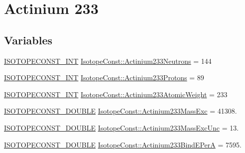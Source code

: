 \hypertarget{group___isotope_const-_actinium-_ac233}{}\section{Actinium 233}
\label{group___isotope_const-_actinium-_ac233}
\subsection*{Variables}
\begin{DoxyCompactItemize}
\item 
\mbox{\hyperlink{group___isotope_const-_macros_ga5f18360b3e99483a35c32d789e62621c}{I\+S\+O\+T\+O\+P\+E\+C\+O\+N\+S\+T\+\_\+\+I\+NT}} \mbox{\hyperlink{group___isotope_const-_actinium-_ac233_gaf223236e8ed52b39bbc070f0c2dd67b1}{Isotope\+Const\+::\+Actinium233\+Neutrons}} = 144
\item 
\mbox{\hyperlink{group___isotope_const-_macros_ga5f18360b3e99483a35c32d789e62621c}{I\+S\+O\+T\+O\+P\+E\+C\+O\+N\+S\+T\+\_\+\+I\+NT}} \mbox{\hyperlink{group___isotope_const-_actinium-_ac233_ga89c2ad6441d70babb87d3ab9555541d2}{Isotope\+Const\+::\+Actinium233\+Protons}} = 89
\item 
\mbox{\hyperlink{group___isotope_const-_macros_ga5f18360b3e99483a35c32d789e62621c}{I\+S\+O\+T\+O\+P\+E\+C\+O\+N\+S\+T\+\_\+\+I\+NT}} \mbox{\hyperlink{group___isotope_const-_actinium-_ac233_ga40e0b4398672bbae84a1a92fd93f1fa0}{Isotope\+Const\+::\+Actinium233\+Atomic\+Weight}} = 233
\item 
\mbox{\hyperlink{group___isotope_const-_macros_ga8f45a7272ce02c0b4c65c44636ed719a}{I\+S\+O\+T\+O\+P\+E\+C\+O\+N\+S\+T\+\_\+\+D\+O\+U\+B\+LE}} \mbox{\hyperlink{group___isotope_const-_actinium-_ac233_gaddeffa031d6d69185a7522f14c8081ec}{Isotope\+Const\+::\+Actinium233\+Mass\+Exc}} = 41308.
\item 
\mbox{\hyperlink{group___isotope_const-_macros_ga8f45a7272ce02c0b4c65c44636ed719a}{I\+S\+O\+T\+O\+P\+E\+C\+O\+N\+S\+T\+\_\+\+D\+O\+U\+B\+LE}} \mbox{\hyperlink{group___isotope_const-_actinium-_ac233_ga2d0ab481434a79a8987cbd4a0071cb17}{Isotope\+Const\+::\+Actinium233\+Mass\+Exc\+Unc}} = 13.
\item 
\mbox{\hyperlink{group___isotope_const-_macros_ga8f45a7272ce02c0b4c65c44636ed719a}{I\+S\+O\+T\+O\+P\+E\+C\+O\+N\+S\+T\+\_\+\+D\+O\+U\+B\+LE}} \mbox{\hyperlink{group___isotope_const-_actinium-_ac233_gaca01ccbccee9298d2989b17c6579e667}{Isotope\+Const\+::\+Actinium233\+Bind\+E\+PerA}} = 7595.
\item 

\end{DoxyCompactItemize}
